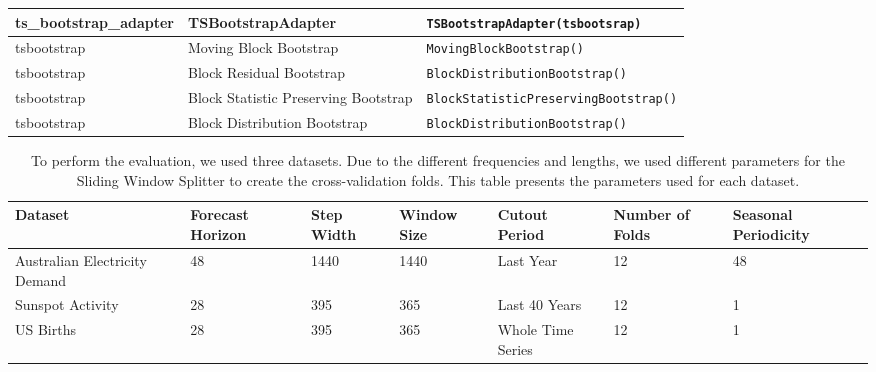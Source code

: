 \begin{table}[]
\begin{tabular}{p{2.5cm}p{4cm}|p{7.5cm}}
         ts\_bootstrap\_adapter & TSBootstrapAdapter & \texttt{TSBootstrapAdapter(tsbootsrap)} \\
         \midrule
 
         tsbootstrap & Moving Block Bootstrap & \texttt{MovingBlockBootstrap()} \\
         tsbootstrap & Block Residual Bootstrap & \texttt{BlockDistributionBootstrap()} \\
         tsbootstrap & Block Statistic Preserving Bootstrap & \texttt{BlockStatisticPreservingBootstrap()} \\
         tsbootstrap & Block Distribution Bootstrap & \texttt{BlockDistributionBootstrap()}\\

         \bottomrule
         
    \end{tabular}
\end{table}

\begin{table}[h]
    \centering
    \footnotesize
    \caption{To perform the evaluation, we used three datasets. Due to the different frequencies and lengths, we used different parameters for the Sliding Window Splitter to create the cross-validation folds. This table presents the parameters used for each dataset.}
    \label{tab:datasets}
    \begin{tabularx}{\textwidth}{X|X|X|X|X|X|X}
         \toprule
        Dataset & Forecast Horizon & Step Width & Window Size & Cutout Period & Number of Folds & Seasonal Periodicity \\ \midrule
        Australian Electricity Demand & 48 & 1440 & 1440 & Last Year & 12 & 48 \\ 
        Sunspot Activity & 28 & 395 & 365 & Last 40 Years & 12 & 1\\
        US Births & 28 & 395 & 365 & Whole Time Series & 12 & 1 \\
        \bottomrule
    \end{tabularx}
\end{table}


